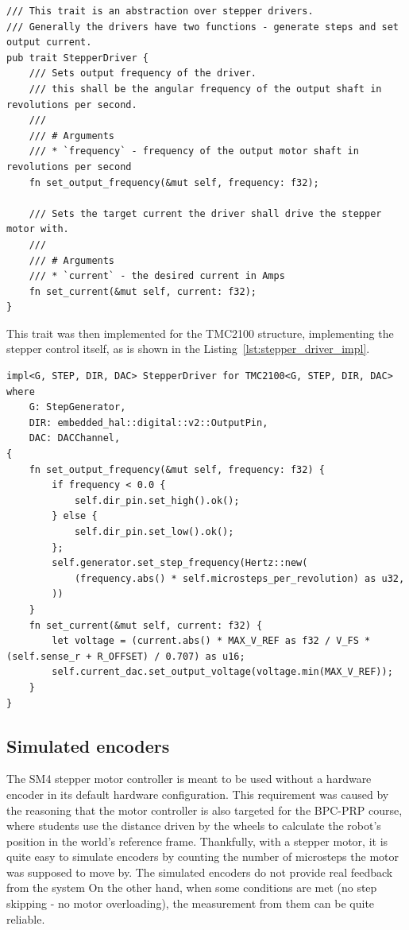 \begin{lstlisting}[caption={Trait for abstracting the stepper motor driver IC.},label=lst:stepper_driver_trait]
/// This trait is an abstraction over stepper drivers.
/// Generally the drivers have two functions - generate steps and set output current.
pub trait StepperDriver {
    /// Sets output frequency of the driver.
    /// this shall be the angular frequency of the output shaft in revolutions per second.
    ///
    /// # Arguments
    /// * `frequency` - frequency of the output motor shaft in revolutions per second
    fn set_output_frequency(&mut self, frequency: f32);

    /// Sets the target current the driver shall drive the stepper motor with.
    ///
    /// # Arguments
    /// * `current` - the desired current in Amps
    fn set_current(&mut self, current: f32);
}
\end{lstlisting}

This trait was then implemented for the TMC2100 structure, implementing the stepper control itself, as is shown in the Listing~\ref{lst:stepper_driver_impl}.

\newpage
\begin{lstlisting}[caption={Implementing the StepperDriver trait for TMC2100.},label=lst:stepper_driver_impl]
impl<G, STEP, DIR, DAC> StepperDriver for TMC2100<G, STEP, DIR, DAC>
where
    G: StepGenerator,
    DIR: embedded_hal::digital::v2::OutputPin,
    DAC: DACChannel,
{
    fn set_output_frequency(&mut self, frequency: f32) {
        if frequency < 0.0 {
            self.dir_pin.set_high().ok();
        } else {
            self.dir_pin.set_low().ok();
        };
        self.generator.set_step_frequency(Hertz::new(
            (frequency.abs() * self.microsteps_per_revolution) as u32,
        ))
    }
    fn set_current(&mut self, current: f32) {
        let voltage = (current.abs() * MAX_V_REF as f32 / V_FS * (self.sense_r + R_OFFSET) / 0.707) as u16;
        self.current_dac.set_output_voltage(voltage.min(MAX_V_REF));
    }
}
\end{lstlisting}

\subsection{Simulated encoders}
\label{subsec:simulated_encoders}
The SM4 stepper motor controller is meant to be used without a hardware encoder in its default hardware configuration.
This requirement was caused by the reasoning that the motor controller is also targeted for the BPC-PRP course, where students use the distance driven by the wheels to calculate the robot's position in the world's reference frame.
Thankfully, with a stepper motor, it is quite easy to simulate encoders by counting the number of microsteps the motor was supposed to move by.
The simulated encoders do not provide real feedback from the system
On the other hand, when some conditions are met (no step skipping - no motor overloading), the measurement from them can be quite reliable.

